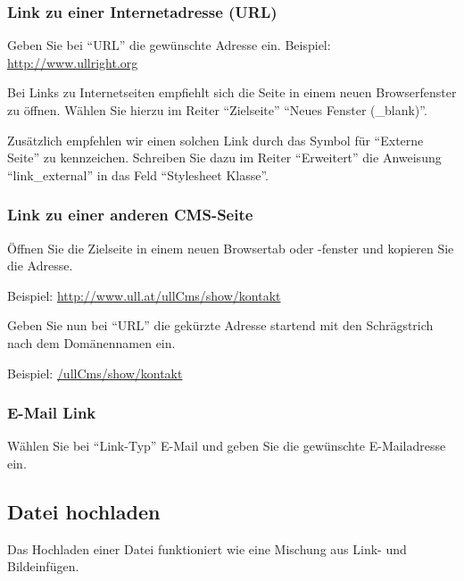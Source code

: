 \documentclass[article, a4paper, oneside, 11pt]{memoir}
\begin{document}
\subsubsection{Link zu einer Internetadresse (URL)}
Geben Sie bei "`URL"' die gewünschte Adresse ein. Beispiel: \url{http://www.ullright.org}

Bei Links zu Internetseiten empfiehlt sich die Seite in einem neuen Browserfenster zu öffnen. Wählen Sie hierzu im Reiter "`Zielseite"' "`Neues Fenster (\_blank)"'.

Zusätzlich empfehlen wir einen solchen Link durch das Symbol für "`Externe Seite"' zu kennzeichen. Schreiben Sie dazu im Reiter "`Erweitert"' die Anweisung "`link\_external"' in das Feld "`Stylesheet Klasse"'.

\subsubsection{Link zu einer anderen CMS-Seite}

Öffnen Sie die Zielseite in einem neuen Browsertab oder -fenster und kopieren Sie die Adresse.

Beispiel: \url{http://www.ull.at/ullCms/show/kontakt}

Geben Sie nun bei "`URL"' die gekürzte Adresse startend mit den Schrägstrich nach dem Domänennamen ein.

Beispiel: \url{/ullCms/show/kontakt}

\subsubsection{E-Mail Link}

Wählen Sie bei "`Link-Typ"' E-Mail und geben Sie die gewünschte E-Mailadresse ein.



\subsection{Datei hochladen}

Das Hochladen einer Datei funktioniert wie eine Mischung aus Link- und Bildeinfügen.
\end{document}
